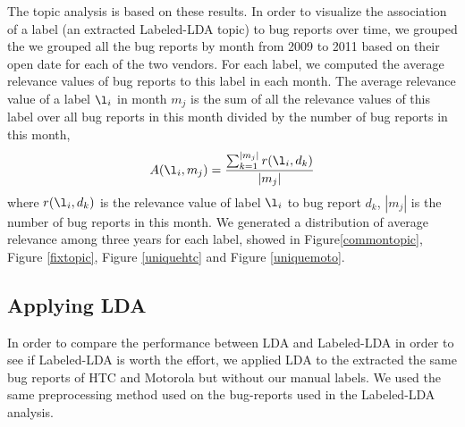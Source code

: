 \documentclass[10pt, conference, compsocconf]{IEEEtran}
\begin{document}
The topic analysis is based on these results. 
In order to visualize the association of a label (an extracted
Labeled-LDA topic) to bug reports over time, we grouped the 
we grouped
all the bug reports by month from 2009 to 2011 based on their open
date for each of the two vendors. 
For each label, we computed the average relevance values of bug
reports to this label in each month. 
The average relevance value of a label \begin{math} \l_i \end{math} in month \begin{math} m_j \end{math} is the sum of all the relevance values of this label over all bug reports in this month divided by the number of bug reports in this month,
\begin{equation}
A(\l_i,m_j) = \frac{\sum_{\substack{k=1}}^{|m_j|}r(\l_i,d_k)}{|m_j|}
\label{equation1}
\end{equation}
where $r(\l_i,d_k)$ is the relevance value of label $\l_i$ to bug
report $d_k$, $|m_j|$ is the number of bug reports in this month. We generated a distribution of average relevance among three years for each label, showed in Figure\ref{commontopic}, Figure \ref{fixtopic}, Figure \ref{uniquehtc} and Figure \ref{uniquemoto}.


\subsection{Applying LDA}




In order to compare the performance between LDA and Labeled-LDA in
order to see if Labeled-LDA is worth the effort, 
we applied LDA to the extracted the same bug reports of HTC and Motorola
but without our manual labels. 
We used the same preprocessing method used on the bug-reports used in
the Labeled-LDA analysis.
\end{document}
